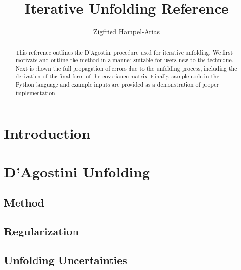 \documentclass[11pt, letter]{article}
\newcommand\blankpage{%
    \null
    \thispagestyle{empty}%
    \addtocounter{page}{-1}%
    \newpage}
\begin{document}
\titleGP
\afterpage{\blankpage}

\title{Iterative Unfolding Reference}
\author{Zigfried Hampel-Arias}
\maketitle


\begin{abstract}

This reference outlines the D'Agostini procedure used for iterative unfolding.
We first motivate and outline the method in a manner suitable for users new to the technique.
Next is shown the full propagation of errors due to the unfolding process, including the derivation
of the final form of the covariance matrix.
Finally, sample code in the Python language and example inputs are provided as a demonstration 
of proper implementation.

\end{abstract}


\tableofcontents
\newpage


\section{Introduction}
\label{introduction_section}
\newpage

\section{D'Agostini Unfolding}

\subsection{Method}\label{unfolding_method_section}


\subsection{Regularization}\label{regularization_section}


\subsection{Unfolding Uncertainties}\label{uncertainties_section}

\newpage
\end{document}
